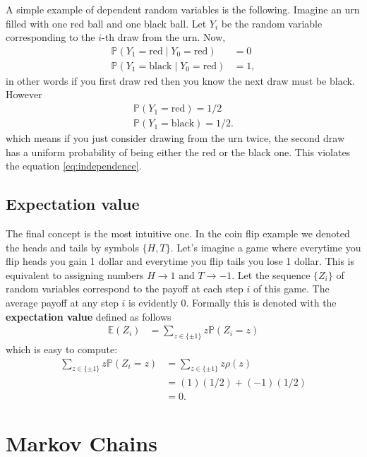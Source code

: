 \documentclass[11pt]{article}
\begin{document}
A simple example of dependent random variables is the following. Imagine an urn
filled with one red ball and one black ball. Let \(Y_{i}\) be the random variable
corresponding to the \(i\)-th draw from the urn. Now,
\begin{align*}
\mathbb{P}(Y_{1} = \text{red} \mid Y_{0} = \text{red}) &= 0 \\
\mathbb{P}(Y_{1} = \text{black} \mid Y_{0} = \text{red}) &= 1,
\end{align*}
in other words if you first draw red then you know the next draw must be black.
However
\begin{align*}
\mathbb{P}(Y_{1} = \text{red}) = 1/2\\
\mathbb{P}(Y_{1} = \text{black}) = 1/2.
\end{align*}
which means if you just consider drawing from the urn twice, the second draw has
a uniform probability of being either the red or the black one. This
violates the equation \eqref{eq:independence}.
\subsection{Expectation value}
\label{sec:orgcc4878a}
The final concept is the most intuitive one. In the coin flip example we denoted
the heads and tails by symbols \(\{H, T\}\). Let's imagine a game where
everytime you flip heads you gain 1 dollar and everytime you flip tails you lose
1 dollar. This is equivalent to assigning numbers \(H \to 1\) and \(T \to -1\).
Let the sequence \(\{Z_{i}\}\) of random variables correspond to the payoff at
each step \(i\) of this game. The average payoff at any step \(i\) is evidently
\(0\). Formally this is denoted with the \textbf{expectation value} defined as follows
\begin{align*}
\mathbb{E}(Z_{i}) &= \sum_{z \in \{\pm 1\}} z \mathbb{P}(Z_{i} = z)
\end{align*}
which is easy to compute:
\begin{align*}
\sum_{z \in \{\pm 1\}} z \mathbb{P}(Z_{i} = z)
                 &= \sum_{z \in \{\pm 1\}} z \rho(z) \\
                 &= (1)(1/2) + (-1)(1/2) \\
                 &= 0.
\end{align*}
\section{Markov Chains}
\label{sec:orgf129e5f}
\end{document}
